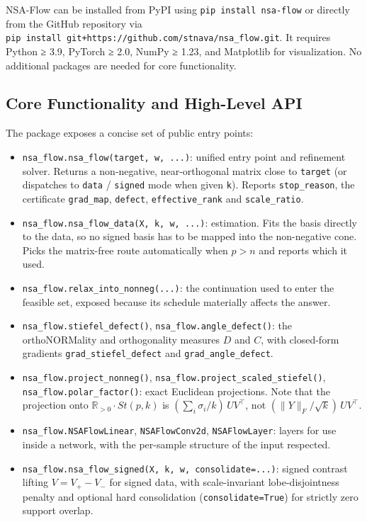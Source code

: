\documentclass[
]{article}
\begin{document}
NSA-Flow can be installed from PyPI using \texttt{pip\ install\ nsa-flow} or directly from the GitHub repository via \texttt{pip\ install\ git+https://github.com/stnava/nsa\_flow.git}. It requires Python ≥ 3.9, PyTorch ≥ 2.0, NumPy ≥ 1.23, and Matplotlib for visualization. No additional packages are needed for core functionality.

\subsection{Core Functionality and High-Level API}\label{core-functionality-and-high-level-api}

The package exposes a concise set of public entry points:

\begin{itemize}
\item
  \texttt{nsa\_flow.nsa\_flow(target,\ w,\ ...)}: unified entry point and refinement solver. Returns a non-negative, near-orthogonal matrix close to \texttt{target} (or dispatches to \texttt{data} / \texttt{signed} mode when given \texttt{k}). Reports \texttt{stop\_reason}, the certificate \texttt{grad\_map}, \texttt{defect}, \texttt{effective\_rank} and \texttt{scale\_ratio}.
\item
  \texttt{nsa\_flow.nsa\_flow\_data(X,\ k,\ w,\ ...)}: estimation. Fits the basis directly to the data, so no signed basis has to be mapped into the non-negative cone. Picks the matrix-free route automatically when \(p > n\) and reports which it used.
\item
  \texttt{nsa\_flow.relax\_into\_nonneg(...)}: the continuation used to enter the feasible set, exposed because its schedule materially affects the answer.
\item
  \texttt{nsa\_flow.stiefel\_defect()}, \texttt{nsa\_flow.angle\_defect()}: the orthoNORMality and orthogonality measures \(D\) and \(C\), with closed-form gradients \texttt{grad\_stiefel\_defect} and \texttt{grad\_angle\_defect}.
\item
  \texttt{nsa\_flow.project\_nonneg()}, \texttt{nsa\_flow.project\_scaled\_stiefel()}, \texttt{nsa\_flow.polar\_factor()}: exact Euclidean projections. Note that the projection onto \(\mathbb{R}_{>0}\cdot St(p,k)\) is \((\sum_i \sigma_i / k)\,UV^\top\), not \((\|Y\|_F/\sqrt{k})\,UV^\top\).
\item
  \texttt{nsa\_flow.NSAFlowLinear}, \texttt{NSAFlowConv2d}, \texttt{NSAFlowLayer}: layers for use inside a network, with the per-sample structure of the input respected.
\item
  \texttt{nsa\_flow.nsa\_flow\_signed(X,\ k,\ w,\ consolidate=...)}: signed contrast lifting \(V = V_+ - V_-\) for signed data, with scale-invariant lobe-disjointness penalty and optional hard consolidation (\texttt{consolidate=True}) for strictly zero support overlap.
\end{itemize}
\end{document}
